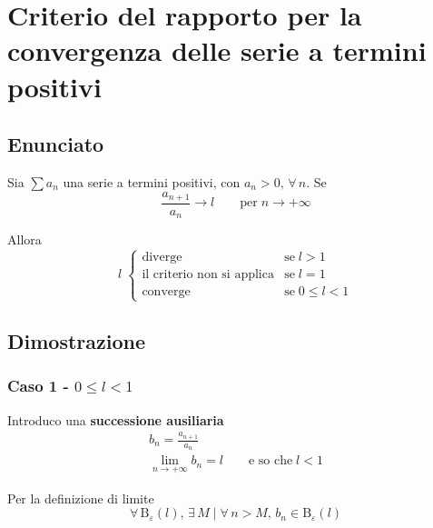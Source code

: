\documentclass[../../dimostrazioni]{subfiles}
\begin{document}
    \chapter{Criterio del rapporto per la convergenza delle serie a termini positivi}
    \label{criterioRapportoSerie}

        \section*{Enunciato}

            Sia \(\sum a_n\) una serie a termini positivi, con \(a_n > 0, \, \forall \, n\). Se
             \[\frac{a_{n+1}}{a_n} \longrightarrow l \qquad  \text{per} \; n \rightarrow +\infty \]
            
            Allora
            \[
                l \;
                \begin{cases}
                    \text{diverge} & \text{se} \; l > 1\\
                    \text{il criterio non si applica} & \text{se} \; l = 1\\
                    \text{converge} & \text{se} \; 0 \leqslant l < 1
                \end{cases}
            \]
            
        \section*{Dimostrazione}
            
            \subsection*{Caso 1 - \(0 \leqslant l < 1\)}

                Introduco una \textbf{successione ausiliaria}
                \begin{gather*}
                    b_n = \frac{a_{n+1}}{a_n}\\
                    \lim_{n \to +\infty} b_n = l \qquad \text{e so che} \; l < 1
                \end{gather*}

                Per la definizione di limite
                \[\forall \, \mathrm{B}_\varepsilon (l), \, \exists \, M \mid \forall \, n > M, \, b_n \in \mathrm{B}_\varepsilon (l) \]
\end{document}
